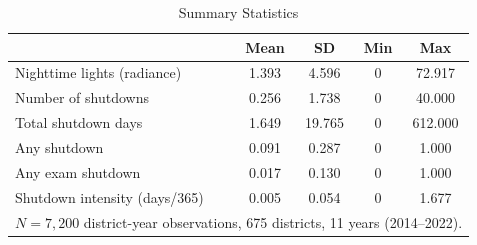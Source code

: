 \begin{table}[t]
\centering
\caption{Summary Statistics}
\label{tab:summary}
\begin{tabular}{lcccc}
\hline\hline
 & Mean & SD & Min & Max \\
\hline
Nighttime lights (radiance) & 1.393 &  4.596 & 0 &  72.917 \\
Number of shutdowns & 0.256 &  1.738 & 0 &  40.000 \\
Total shutdown days & 1.649 & 19.765 & 0 & 612.000 \\
Any shutdown & 0.091 &  0.287 & 0 &   1.000 \\
Any exam shutdown & 0.017 &  0.130 & 0 &   1.000 \\
Shutdown intensity (days/365) & 0.005 &  0.054 & 0 &   1.677 \\
\hline
\multicolumn{5}{l}{\footnotesize $N = 7,200$ district-year observations, 675 districts, 11 years (2014--2022).} \\
\hline\hline
\end{tabular}
\end{table}

